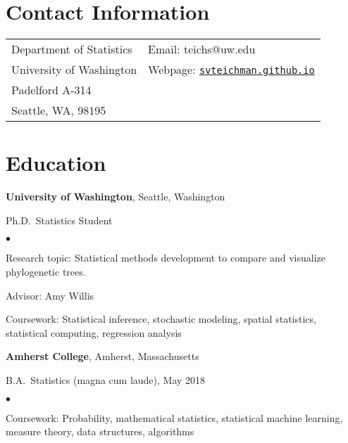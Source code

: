 \documentclass[margin,centered]{res}
\newenvironment{list1}{
  \begin{list}{\ding{113}}{%
      \setlength{\itemsep}{0in}
      \setlength{\parsep}{0in} \setlength{\parskip}{0in}
      \setlength{\topsep}{0in} \setlength{\partopsep}{0in}
      \setlength{\leftmargin}{0.17in}}}{\end{list}}
\newenvironment{list2}{
  \begin{list}{$\bullet$}{%
      \setlength{\itemsep}{0in}
      \setlength{\parsep}{0in} \setlength{\parskip}{0in}
      \setlength{\topsep}{0in} \setlength{\partopsep}{0in}
      \setlength{\leftmargin}{0.2in}}}{\end{list}}
\begin{document}
\vspace*{.1in}


\begin{resume}

\section{\sc Contact Information}

\vspace{.05in}
\begin{tabular}{@{}p{2.0in}p{2.9in}}
Department of Statistics& Email:  teichs@uw.edu \\
University of Washington  &Webpage: \href{https://svteichman.github.io/}{\texttt{svteichman.github.io}}
\\
Padelford A-314	                   	   \\
Seattle, WA, 98195             & \\






\end{tabular}

\section{\sc Education}
{\bf University of Washington}, Seattle, Washington
\begin{list1}
\item[] 
Ph.D.~Statistics Student
\begin{list2}
\vspace*{.05in}
\item Research topic: Statistical methods development to compare and visualize phylogenetic trees.
\item Advisor: Amy Willis
\item Coursework: Statistical inference, stochastic modeling, spatial statistics, statistical computing, regression analysis
\end{list2}
\end{list1}



{\bf Amherst College}, Amherst, Massachusetts
\begin{list1}
\item[] B.A.~Statistics (magna cum laude), May 2018
\begin{list2}
\vspace*{.05in}
\item Coursework: Probability, mathematical statistics, statistical machine learning, measure theory, data
structures, algorithms
\end{list2}
\end{list1}



\end{resume}
\end{document}
